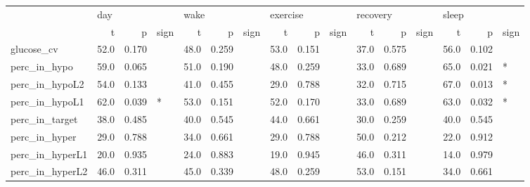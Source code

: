 \begin{tabular}{lrrlrrlrrlrrlrrl}
\toprule
{} & \multicolumn{3}{l}{day} & \multicolumn{3}{l}{wake} & \multicolumn{3}{l}{exercise} & \multicolumn{3}{l}{recovery} & \multicolumn{3}{l}{sleep} \\
{} &     t &      p & sign &     t &      p & sign &        t &      p & sign &        t &      p & sign &     t &      p & sign \\
\midrule
glucose_cv      &  52.0 &  0.170 &      &  48.0 &  0.259 &      &     53.0 &  0.151 &      &     37.0 &  0.575 &      &  56.0 &  0.102 &      \\
perc_in_hypo    &  59.0 &  0.065 &      &  51.0 &  0.190 &      &     48.0 &  0.259 &      &     33.0 &  0.689 &      &  65.0 &  0.021 &    * \\
perc_in_hypoL2  &  54.0 &  0.133 &      &  41.0 &  0.455 &      &     29.0 &  0.788 &      &     32.0 &  0.715 &      &  67.0 &  0.013 &    * \\
perc_in_hypoL1  &  62.0 &  0.039 &    * &  53.0 &  0.151 &      &     52.0 &  0.170 &      &     33.0 &  0.689 &      &  63.0 &  0.032 &    * \\
perc_in_target  &  38.0 &  0.485 &      &  40.0 &  0.545 &      &     44.0 &  0.661 &      &     30.0 &  0.259 &      &  40.0 &  0.545 &      \\
perc_in_hyper   &  29.0 &  0.788 &      &  34.0 &  0.661 &      &     29.0 &  0.788 &      &     50.0 &  0.212 &      &  22.0 &  0.912 &      \\
perc_in_hyperL1 &  20.0 &  0.935 &      &  24.0 &  0.883 &      &     19.0 &  0.945 &      &     46.0 &  0.311 &      &  14.0 &  0.979 &      \\
perc_in_hyperL2 &  46.0 &  0.311 &      &  45.0 &  0.339 &      &     48.0 &  0.259 &      &     53.0 &  0.151 &      &  34.0 &  0.661 &      \\
\bottomrule
\end{tabular}
